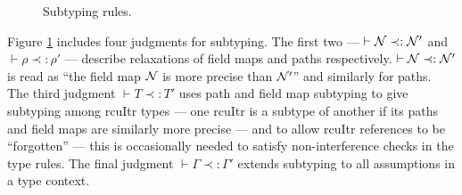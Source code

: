 \begin{figure}[!t]\scriptsize
{}
\vspace{-2em}
\caption{Subtyping rules.}
\label{fig:sub-typing}
\end{figure}

Figure \ref{fig:sub-typing} includes four judgments for subtyping.  The first two --- $\vdash\mathcal{N}\prec:\mathcal{N}'$ and $\vdash\rho\prec:\rho'$ --- describe relaxations of field maps and paths respectively.  $\vdash\mathcal{N}\prec:\mathcal{N}'$ is read as ``the field map $\mathcal{N}$ is more precise than $\mathcal{N}'$'' and similarly for paths.
The third judgment $\vdash T\prec:T'$ uses path and field map subtyping to give subtyping among \textsf{rcuItr} types --- one \textsf{rcuItr} is a subtype of another if its paths and field maps are similarly more precise --- and to allow \textsf{rcuItr} references to be ``forgotten'' --- this is occasionally needed to satisfy non-interference checks in the type rules.
The final judgment $\vdash\Gamma\prec:\Gamma'$ extends subtyping to all assumptions in a type context.

